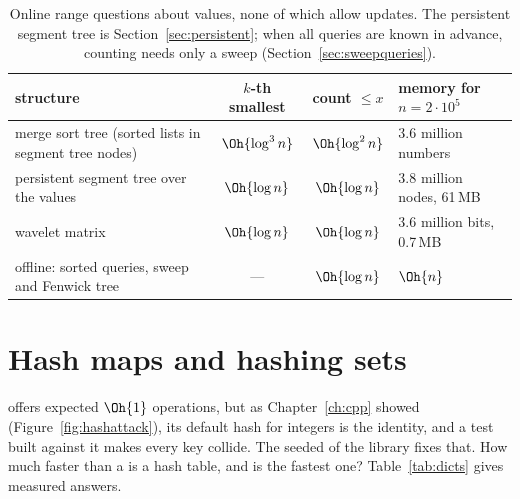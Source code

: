 \begin{table}[htbp]
\centering\small
\begin{tabular}{@{}lccl@{}}
\toprule
structure & $k$-th smallest & count $\le x$ & memory for $n = 2 \cdot 10^5$ \\
\midrule
merge sort tree (sorted lists in segment tree nodes) & $\Oh{\log^3 n}$ & $\Oh{\log^2 n}$ & 3.6 million numbers \\
persistent segment tree over the values & $\Oh{\log n}$ & $\Oh{\log n}$ & 3.8 million nodes, 61\,MB \\
wavelet matrix & $\Oh{\log n}$ & $\Oh{\log n}$ & 3.6 million bits, 0.7\,MB \\
offline: sorted queries, sweep and Fenwick tree & --- & $\Oh{\log n}$ & $\Oh{n}$ \\
\bottomrule
\end{tabular}
\caption{Online range questions about values, none of which allow updates. The persistent segment tree is
Section~\ref{sec:persistent}; when all queries are known in advance, counting needs only a sweep (Section~\ref{sec:sweepqueries}).}
\label{tab:kthrange}
\end{table}

\section[Hash maps and hashing sets]{Hash maps and hashing sets \hfill \gold}\label{sec:hashmaps-adv}

 offers expected $\Oh{1}$ operations, but as Chapter~\ref{ch:cpp} showed (Figure~\ref{fig:hashattack}), its default
hash for integers is the identity, and a test built against it makes every key collide. The seeded  of the library
fixes that. How much faster than a  is a hash table, and is  the fastest one? Table~\ref{tab:dicts} gives
measured answers.

